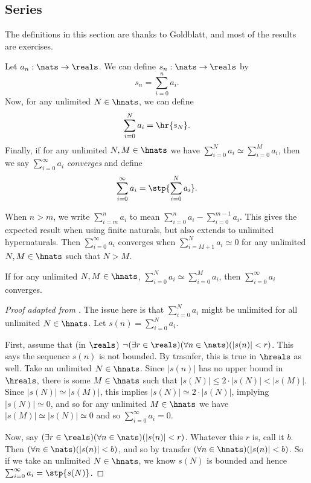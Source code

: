 \subsection{Series}
The definitions in this section are thanks to Goldblatt, and most of the results are exercises.

Let $a_n: \nats \to \reals$. We can define $s_n: \nats \to \reals$ by 
\[ s_n = \sum_{i=0}^n a_i. \]
Now, for any unlimited $N \in \hnats$, we can define
\[ \sum_{i=0}^N a_i = \hr{s_N}. \]
Finally, if for any unlimited $N, M \in \hnats$ we have $\sum_{i=0}^N a_i \simeq \sum_{i=0}^M a_i$, then we say $\sum_{i=0}^\infty a_i$ \textit{converges} and define
\[ \sum_{i=0}^\infty a_i = \stp{\sum_{i=0}^N a_i}. \] 

When $n > m$, we write $\sum_{i=m}^n a_i$ to mean $\sum_{i=0}^n a_i - \sum_{i=0}^{m-1} a_i$. This gives the expected result when using finite naturals, but also extends to unlimited hypernaturals. Then $\sum_{i=0}^\infty a_i$ converges when $\sum_{i=M+1}^N a_i \simeq 0$ for any unlimited $N, M \in \hnats$ such that $N > M$.

\begin{thm}
    If for any unlimited $N, M \in \hnats$, $\sum_{i=0}^N a_i \simeq \sum_{i=0}^M a_i$, then $\sum_{i=0}^\infty a_i$ converges.
\end{thm}

\begin{proof}[Proof adapted from ]
    The issue here is that $\sum_{i=0}^N a_i$ might be unlimited for all unlimited $N \in \hnats$. Let $s(n) = \sum_{i=0}^N a_i$. 
    
    First, assume that (in $\reals$) $\neg (\exists r \in \reals) (\forall n \in \nats)(|s(n)| < r)$. This says the sequence $s(n)$ is not bounded. By trasnfer, this is true in $\hreals$ as well. Take an unlimited $N \in \hnats$. Since $|s(n)|$ has no upper bound in $\hreals$, there is some $M \in \hnats$ such that $|s(N)| \leq 2 \cdot |s(N)| < |s(M)|$. Since $|s(N)| \simeq |s(M)|$, this implies $|s(N)| \simeq 2 \cdot |s(N)|$, implying $|s(N)| \simeq 0$, and so for any unlimited $M \in \hnats$ we have $|s(M)| \simeq |s(N)| \simeq 0$ and so $\sum_{i=0}^\infty a_i = 0$.

    Now, say $(\exists r \in \reals) (\forall n \in \nats)(|s(n)| < r)$. Whatever this $r$ is, call it $b$. Then $(\forall n \in \nats)(|s(n)| < b)$, and so by transfer $(\forall n \in \hnats)(|s(n)| < b)$. So if we take an unlimited $N \in \hnats$, we know $s(N)$ is bounded and hence $\sum_{i=0}^\infty a_i = \stp{s(N)}$.
\end{proof}


